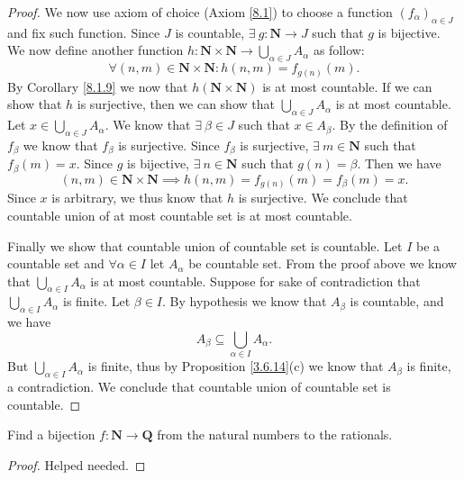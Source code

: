 \begin{proof}
    We now use axiom of choice (Axiom \ref{8.1}) to choose a function \((f_{\alpha})_{\alpha \in J}\) and fix such function.
    Since \(J\) is countable, \(\exists\ g : \mathbf{N} \to J\) such that \(g\) is bijective.
    We now define another function \(h : \mathbf{N} \times \mathbf{N} \to \bigcup_{\alpha \in J} A_{\alpha}\) as follow:
    \[
        \forall (n, m) \in \mathbf{N} \times \mathbf{N} : h(n, m) = f_{g(n)}(m).
    \]
    By Corollary \ref{8.1.9} we now that \(h(\mathbf{N} \times \mathbf{N})\) is at most countable.
    If we can show that \(h\) is surjective, then we can show that \(\bigcup_{\alpha \in J} A_{\alpha}\) is at most countable.
    Let \(x \in \bigcup_{\alpha \in J} A_{\alpha}\).
    We know that \(\exists\ \beta \in J\) such that \(x \in A_{\beta}\).
    By the definition of \(f_{\beta}\) we know that \(f_{\beta}\) is surjective.
    Since \(f_{\beta}\) is surjective, \(\exists\ m \in \mathbf{N}\) such that \(f_{\beta}(m) = x\).
    Since \(g\) is bijective, \(\exists\ n \in \mathbf{N}\) such that \(g(n) = \beta\).
    Then we have
    \[
        (n, m) \in \mathbf{N} \times \mathbf{N} \implies h(n, m) = f_{g(n)}(m) = f_{\beta}(m) = x.
    \]
    Since \(x\) is arbitrary, we thus know that \(h\) is surjective.
    We conclude that countable union of at most countable set is at most countable.

    Finally we show that countable union of countable set is countable.
    Let \(I\) be a countable set and \(\forall \alpha \in I\) let \(A_{\alpha}\) be countable set.
    From the proof above we know that \(\bigcup_{\alpha \in I} A_{\alpha}\) is at most countable.
    Suppose for sake of contradiction that \(\bigcup_{\alpha \in I} A_{\alpha}\) is finite.
    Let \(\beta \in I\).
    By hypothesis we know that \(A_{\beta}\) is countable, and we have
    \[
        A_{\beta} \subseteq \bigcup_{\alpha \in I} A_{\alpha}.
    \]
    But \(\bigcup_{\alpha \in I} A_{\alpha}\) is finite, thus by Proposition \ref{3.6.14}(c) we know that \(A_{\beta}\) is finite, a contradiction.
    We conclude that countable union of countable set is countable.
\end{proof}

\begin{exercise}\label{ex 8.1.10}
    Find a bijection \(f : \mathbf{N} \to \mathbf{Q}\) from the natural numbers to the rationals.
\end{exercise}

\begin{proof}
    Helped needed.
\end{proof}